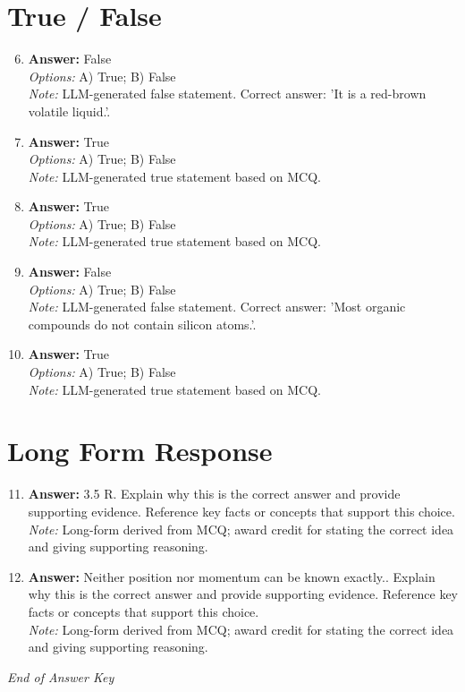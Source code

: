 \documentclass[12pt]{article}
\begin{document}
\section*{True / False}
\begin{enumerate}[label=\arabic*.]
\setcounter{enumi}{5}
\item \textbf{Answer:} False
\\ \textit{Options:} A) True; B) False
\\ \textit{Note:} LLM-generated false statement. Correct answer: 'It is a red-brown volatile liquid.'.
\item \textbf{Answer:} True
\\ \textit{Options:} A) True; B) False
\\ \textit{Note:} LLM-generated true statement based on MCQ.
\item \textbf{Answer:} True
\\ \textit{Options:} A) True; B) False
\\ \textit{Note:} LLM-generated true statement based on MCQ.
\item \textbf{Answer:} False
\\ \textit{Options:} A) True; B) False
\\ \textit{Note:} LLM-generated false statement. Correct answer: 'Most organic compounds do not contain silicon atoms.'.
\item \textbf{Answer:} True
\\ \textit{Options:} A) True; B) False
\\ \textit{Note:} LLM-generated true statement based on MCQ.
\end{enumerate}

\section*{Long Form Response}
\begin{enumerate}[label=\arabic*.]
\setcounter{enumi}{10}
\item \textbf{Answer:} 3.5 R. Explain why this is the correct answer and provide supporting evidence. Reference key facts or concepts that support this choice.
\\ \textit{Note:} Long-form derived from MCQ; award credit for stating the correct idea and giving supporting reasoning.
\item \textbf{Answer:} Neither position nor momentum can be known exactly.. Explain why this is the correct answer and provide supporting evidence. Reference key facts or concepts that support this choice.
\\ \textit{Note:} Long-form derived from MCQ; award credit for stating the correct idea and giving supporting reasoning.
\end{enumerate}

\vfill
\noindent\textit{End of Answer Key}
\end{document}
